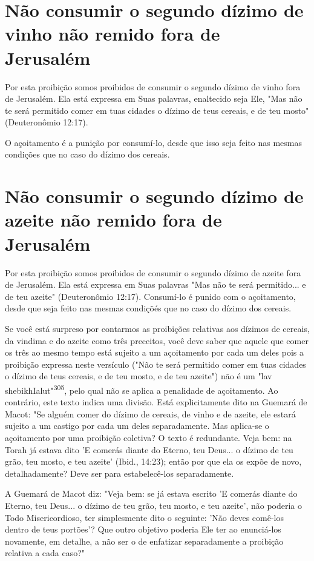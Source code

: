 \begin{itemize}
\begin{enumrate}
\begin{itemize}
\begin{itemize}
\begin{itemize}
\section{Não consumir o segundo dízimo de vinho não remido fora de Jerusalém}

Por esta proibição somos proibidos de consumir o segundo dízimo de vinho
fora de Jerusalém. Ela está expressa em Suas palavras, enaltecido seja
Ele, "Mas não te será permitido comer em tuas cidades o dízimo de teus
ce­reais, e de teu mosto" (Deuteronômio 12:17).

O açoitamento é a punição por consumí-lo, desde que isso seja feito nas
mesmas condições que no caso do dízimo dos cereais.

\section{Não consumir o segundo dízimo de azeite não remido fora de Jerusalém}

Por esta proibição somos proibidos de consumir o segundo dízimo de
azeite fora de Jerusalém. Ela está expressa em Suas palavras "Mas não te
será permitido... e de teu azeite" (Deuteronômio 12:17). Consumí-lo é
punido com o açoitamento, desde que seja feito nas mesmas condiçõés que
no caso do dízi­mo dos cereais.

Se você está surpreso por contarmos as proibições relativas aos dízi­mos
de cereais, da vindima e do azeite como três preceitos, você deve saber
que aquele que comer os três ao mesmo tempo está sujeito a um
açoitamento por cada um deles pois a proibição expressa neste versículo
("Não te será permi­tido comer em tuas cidades o dízimo de teus cereais,
e de teu mosto, e de teu azeite") não é um "lav
shebikhIalut"\textsuperscript{305}, pelo qual não se aplica a penalidade
de açoitamento. Ao contrário, este texto indica uma divisão. Está
explicitamente dito na Guemará de Macot: "Se alguém comer do dízimo de
cereais, de vinho e de azeite, ele estará sujeito a um castigo por cada
um deles separadamente. Mas aplica-se o açoitamento por uma proibição
coletiva? O texto é redundante. Veja bem: na Torah já estava dito 'E
comerás diante do Eterno, teu Deus... o dízimo de teu grão, teu mosto, e
teu azeite' (Ibid., 14:23); então por que ela os expõe de novo,
detalhadamente? Deve ser para estabelecê-los separadamente.

A Guemará de Macot diz: "Veja bem: se já estava escrito 'E comerás
diante do Eterno, teu Deus... o dízimo de teu grão, teu mosto, e teu
azeite', não poderia o Todo Misericordioso, ter simplesmente dito o
seguinte: 'Não de­ves comê-los dentro de teus portões'? Que outro
objetivo poderia Ele ter ao enunciá-los novamente, em detalhe, a não ser
o de enfatizar separadamente a proibição relativa a cada caso?"


\end{itemize}
\end{itemize}
\end{itemize}
\end{enumrate}
\end{itemize}
